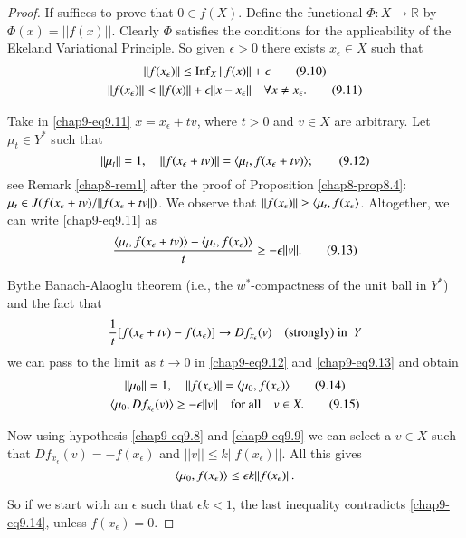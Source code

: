 \begin{proof}
If suffices to prove that $0\in f(X)$. Define the functional
$\Phi:X\to \mathbb{R}$ by $\Phi(x)=||f(x)||$. Clearly $\Phi$ satisfies
the conditions for the applicability of the Ekeland Variational
Principle. So given $\epsilon>0$ there exists $x_{\epsilon}\in X$ such
that
\begin{gather*}
||f(x_{\epsilon})||\leq
\Inf_{X}||f(x)||+\epsilon\tag{9.10}\label{chap9-eq9.10}\\ 
||f(x_{\epsilon})||<||f(x)||+\epsilon||x-x_{\epsilon}||\q \forall
x\neq x_{\epsilon}.\tag{9.11}\label{chap9-eq9.11}
\end{gather*}

Take in \eqref{chap9-eq9.11} $x=x_{\epsilon}+tv$, where $t>0$ and
$v\in X$ are arbitrary. Let $\mu_{t}\in Y^{*}$ such that
\begin{equation*}
||\mu_{t}||=1,\quad ||f(x_{\epsilon}+tv)||=\langle
\mu_{t},f(x_{\epsilon}+tv)\rangle;\tag{9.12}\label{chap9-eq9.12}
\end{equation*}
see Remark \ref{chap8-rem1} after the proof of Proposition
\ref{chap8-prop8.4}: $\mu_{t}\in
J(f(x_{\epsilon}+tv)/\break ||f(x_{\epsilon}+tv||)$. We observe that
$||f(x_{\epsilon})||\geq \langle \mu_{t},f(x_{\epsilon}\rangle$. Altogether,
we can write \eqref{chap9-eq9.11} as
\begin{equation*}
\frac{\langle
  \mu_{t},f(x_{\epsilon}+tv)\rangle-\langle\mu_{t},f(x_{\epsilon})\rangle}{t}\geq
-\epsilon||v||.\tag{9.13}\label{chap9-eq9.13} 
\end{equation*}

By\pageoriginale the Banach-Alaoglu theorem (i.e., the
$w^{*}$-compactness of the unit ball in $Y^{*}$) and the fact that
$$
\frac{1}{t}[f(x_{\epsilon}+tv)-f(x_{\epsilon})]\to
Df_{x_{\epsilon}}(v)\quad\text{(strongly) in }~ Y
$$
we can pass to the limit as $t\to 0$ in \eqref{chap9-eq9.12} and
\eqref{chap9-eq9.13} and obtain
\begin{gather*}
||\mu_{0}||=1,\quad ||f(x_{\epsilon})||=\langle
\mu_{0},f(x_{\epsilon})\rangle\tag{9.14}\label{chap9-eq9.14}\\ 
\langle \mu_{0},Df_{x_{\epsilon}}(v)\rangle\geq -\epsilon||v||\quad \text{for
  all}\quad v\in X.\tag{9.15}\label{chap9-eq9.15}
\end{gather*}

Now using hypothesis \eqref{chap9-eq9.8} and \eqref{chap9-eq9.9} we
can select a $v\in X$ such that
$Df_{x_{\epsilon}}(v)=-f(x_{\epsilon})$ and $||v||\leq
k||f(x_{\epsilon})||$. All this gives 
$$
\langle \mu_{0},f(x_{\epsilon})\rangle\leq \epsilon k||f(x_{\epsilon})||.
$$

So if we start with an $\epsilon$ such that $\epsilon k<1$, the last
inequality contradicts \eqref{chap9-eq9.14}, unless $f(x_{\epsilon})=0$.
\end{proof}

